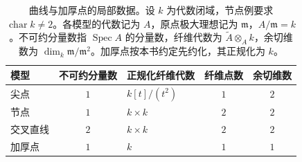 \begin{table}[htbp]
	\centering
	\caption[曲线与加厚点的局部数据]{曲线与加厚点的局部数据。设 \(k\) 为代数闭域，节点例要求 \(\operatorname{char}k\ne2\)。各模型的代数记为 \(A\)，原点极大理想记为 \(\mathfrak m\)，\(A/\mathfrak m=k\)。不可约分量数指 \(\operatorname{Spec}A\) 的分量数，纤维代数为 \(\widetilde A\otimes_Ak\)，余切维数为 \(\dim_k\mathfrak m/\mathfrak m^2\)。加厚点按本书约定先约化，其正规化为 \(k\)。}
	\label{b3:tab:curve-thick-point-data}
	\begin{tabularx}{\textwidth}{@{}l c>{\raggedright\arraybackslash}X c c@{}}
		\toprule
		模型 & 不可约分量数 & 正规化纤维代数 & 纤维点数 & 余切维数\\
		\midrule
		尖点 & \(1\) & \(k[t]/(t^2)\) & \(1\) & \(2\)\\
		节点 & \(1\) & \(k\times k\) & \(2\) & \(2\)\\
		交叉直线 & \(2\) & \(k\times k\) & \(2\) & \(2\)\\
		加厚点 & \(1\) & \(k\) & \(1\) & \(1\)\\
		\bottomrule
	\end{tabularx}
\end{table}
